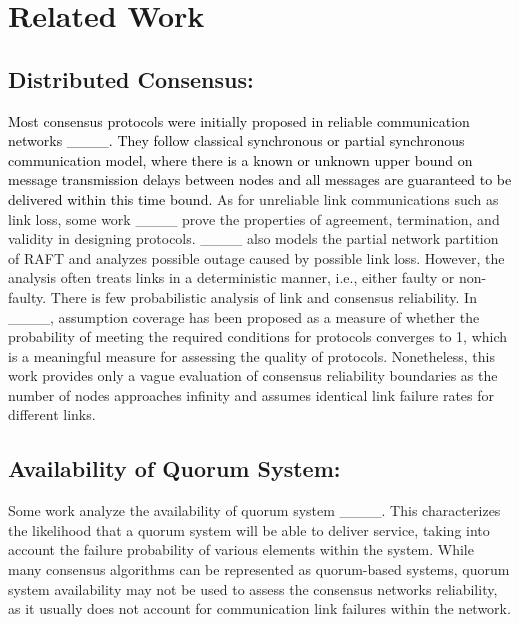 \section{Related Work}
\label{sec: related work}

\subsection{Distributed Consensus:}
\textcolor{black}{Most consensus protocols were initially proposed in reliable communication networks ____. They follow classical synchronous or partial synchronous communication model, where there is a known or unknown upper bound on message transmission delays between nodes and all messages are guaranteed to be delivered within this time bound.} As for unreliable link communications such as link loss, some work ____ prove the properties of agreement, termination, and validity in designing protocols. ____ also models the partial network partition of RAFT and analyzes possible outage caused by possible link loss. However, the analysis often treats links in a deterministic manner, i.e., either faulty or non-faulty. There is few probabilistic analysis of link and consensus reliability. 
In ____, assumption coverage has been proposed as a measure of whether the probability of meeting the required conditions for protocols converges to 1, which is a meaningful measure for assessing the quality of protocols. Nonetheless, this work provides only a vague evaluation of consensus reliability boundaries as the number of nodes approaches infinity and assumes identical link failure rates for different links. 

\subsection{Availability of Quorum System: } Some work analyze the availability of quorum system ____. This characterizes the likelihood that a quorum system will be able to deliver service, taking into account the failure probability of various elements within the system. While many consensus algorithms can be represented as quorum-based systems, quorum system availability may not be used to assess the consensus networks reliability, as it usually does not account for communication link failures within the network.



